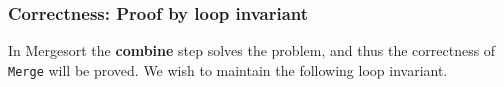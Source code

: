 \subsubsection*{Correctness: Proof by loop invariant}
In Mergesort the \textbf{combine} step solves the problem, and thus the
correctness of \texttt{Merge} will be proved.\newline\newline
We wish to maintain the following loop invariant. 
